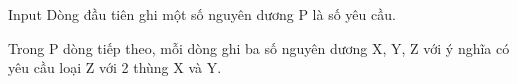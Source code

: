 Input  
Dòng đầu tiên ghi một số nguyên dương P là số yêu cầu.  

   Trong P dòng tiếp theo, mỗi dòng ghi ba số nguyên dương X, Y, Z với ý nghĩa có yêu cầu loại Z với 2 thùng X và Y.